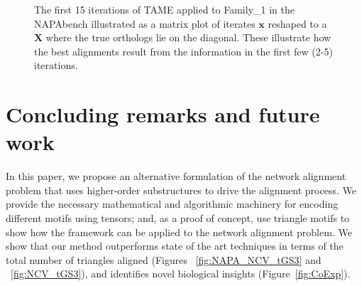 \documentclass[10pt, journal, compsoc, final]{IEEEtran}
\newcommand{\bs}[1]{\boldsymbol{#1}}
\newcommand{\Vector}[1]{\bs{#1}}
\newcommand{\Matrix}[1]{\mathbf{#1}}
\begin{document}
\begin{figure*}[!t]
\centering
{}
\hfil
{}
\hfil
{}
\hfil
{}
\hfil
{}

\hfil
{}
\hfil
{}
\hfil
{}
\hfil
{}

\hfil
{}
\hfil
{}
\hfil
{}
\hfil
{}
\hfil

\caption{The first 15 iterations of TAME applied to Family\_1 in the NAPAbench illustrated
as a matrix plot of iterates $\Vector{x}$ reshaped to a $\Matrix{X}$ where the true
orthologs lie on the diagonal. These illustrate how the best alignments result
from the information in the first few (2-5) iterations. }
\label{fig:NAPA_iterations}
\end{figure*}



\section{Concluding remarks and future work}

In this paper, we propose an alternative formulation of the network alignment problem that
uses higher-order substructures to drive the alignment process. We provide the 
necessary mathematical and algorithmic machinery for encoding different motifs using
tensors; and, as a proof of concept, use triangle motifs to show how the framework
can be applied to the network alignment problem. We show that our method
outperforms state of the art techniques in terms of the total number of triangles aligned (Figures ~\ref{fig:NAPA_NCV_tGS3} and ~\ref{fig:NCV_tGS3}), and identifies novel biological insights (Figure~\ref{fig:CoExp}).
\end{document}
